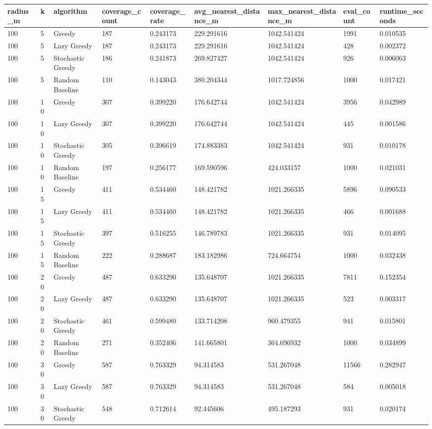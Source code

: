 \begin{tabular}{lllllllll}
\hline
radius_m & k & algorithm & coverage_count & coverage_rate & avg_nearest_distance_m & max_nearest_distance_m & eval_count & runtime_seconds \\
\hline
100 & 5 & Greedy & 187 & 0.243173 & 229.291616 & 1042.541424 & 1991 & 0.010535 \\
100 & 5 & Lazy Greedy & 187 & 0.243173 & 229.291616 & 1042.541424 & 428 & 0.002372 \\
100 & 5 & Stochastic Greedy & 186 & 0.241873 & 269.827427 & 1042.541424 & 926 & 0.006063 \\
100 & 5 & Random Baseline & 110 & 0.143043 & 380.204344 & 1017.724856 & 1000 & 0.017421 \\
100 & 10 & Greedy & 307 & 0.399220 & 176.642744 & 1042.541424 & 3956 & 0.042989 \\
100 & 10 & Lazy Greedy & 307 & 0.399220 & 176.642744 & 1042.541424 & 445 & 0.001586 \\
100 & 10 & Stochastic Greedy & 305 & 0.396619 & 174.883383 & 1042.541424 & 931 & 0.010178 \\
100 & 10 & Random Baseline & 197 & 0.256177 & 169.590596 & 424.033157 & 1000 & 0.021031 \\
100 & 15 & Greedy & 411 & 0.534460 & 148.421782 & 1021.266335 & 5896 & 0.090533 \\
100 & 15 & Lazy Greedy & 411 & 0.534460 & 148.421782 & 1021.266335 & 466 & 0.001688 \\
100 & 15 & Stochastic Greedy & 397 & 0.516255 & 146.789783 & 1021.266335 & 931 & 0.014095 \\
100 & 15 & Random Baseline & 222 & 0.288687 & 183.182986 & 724.664754 & 1000 & 0.032438 \\
100 & 20 & Greedy & 487 & 0.633290 & 135.648707 & 1021.266335 & 7811 & 0.152354 \\
100 & 20 & Lazy Greedy & 487 & 0.633290 & 135.648707 & 1021.266335 & 523 & 0.003317 \\
100 & 20 & Stochastic Greedy & 461 & 0.599480 & 133.714208 & 960.479355 & 941 & 0.015801 \\
100 & 20 & Random Baseline & 271 & 0.352406 & 141.665801 & 364.696932 & 1000 & 0.034899 \\
100 & 30 & Greedy & 587 & 0.763329 & 94.314583 & 531.267048 & 11566 & 0.282947 \\
100 & 30 & Lazy Greedy & 587 & 0.763329 & 94.314583 & 531.267048 & 584 & 0.005018 \\
100 & 30 & Stochastic Greedy & 548 & 0.712614 & 92.445606 & 495.187293 & 931 & 0.020174 \\

\end{tabular}
